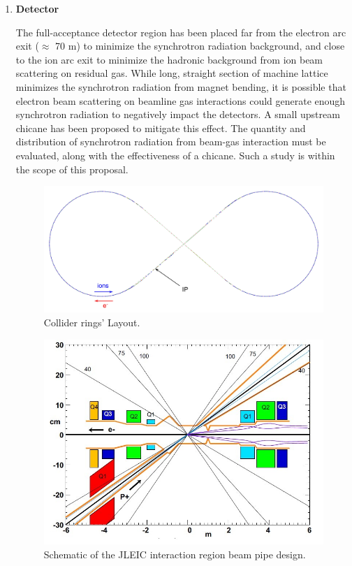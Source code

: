 \begin{enumerate}	
\item{\textbf{Detector}}

The full-acceptance detector region has been placed far from the electron arc exit ($\approx$ 70 m) to minimize the synchrotron radiation background, and close to the ion arc exit to minimize the hadronic background from ion beam scattering on residual gas.  While long, straight section of machine lattice minimizes the synchrotron radiation from magnet bending, it is possible that electron beam scattering on beamline gas interactions could generate enough synchrotron radiation to negatively impact the detectors.  A small upstream chicane has been proposed to mitigate this effect. The quantity and distribution of synchrotron radiation from beam-gas interaction must be evaluated, along with the effectiveness of a chicane.  Such a study is within the scope of this proposal.  
\begin{figure}
	\centering
	\includegraphics[width=.75\textwidth]{../../img/collider_rings_layout.jpg}
	\caption{Collider rings' Layout.}
	\label{fig:jleic2}
\end{figure}
\begin{figure}[h!]
	\centering
	\includegraphics[width=.75\textwidth]{../../img/new_beam_pipe.jpg}
	\caption{Schematic of the JLEIC interaction region beam pipe design.}
	\label{fig:jleic3}
\end{figure}


\end{enumerate}
